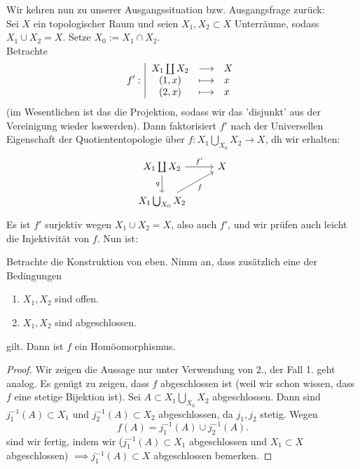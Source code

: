 Wir kehren nun zu unserer Ausgangssituation bzw. Ausgangsfrage zurück: \\
Sei $X$ ein topologischer Raum und seien  $X_1,X_2\subset X$ Unterräume, sodass $X_1 \cup X_2 = X$. Setze $X_0 := X_1 \cap  X_2$. \\
Betrachte
    \begin{equation*}
    f': \left| \begin{array}{c c l} 
    X_1\coprod X_2 & \longrightarrow & X \\
    (1,x) & \longmapsto &  x \\
    (2,x) & \longmapsto & x
    \end{array} \right.
\end{equation*}
(im Wesentlichen ist das die Projektion, sodass wir das 'disjunkt' aus der Vereinigung wieder loswerden). Dann faktorisiert $f'$ nach der Universellen Eigenschaft der Quotiententopologie über $f: X_1 \bigcup_{X_0} X_2 \to  X$, dh wir erhalten:
\[
\begin{tikzcd}
    X_1 \coprod X_2 \ar{r}{f'} \ar[swap]{d}{q} & X \\
    X_1 \bigcup_{X_0} X_2 \ar[swap]{ur}{f} 
\end{tikzcd}
\]
Es ist $f'$ surjektiv wegen  $X_1 \cup X_2 = X$, also auch $f'$, und wir prüfen auch leicht die Injektivität von  $f$. Nun ist:

\begin{theorem}\label{thm:raum-ist-koprodukt-über-schnitt-zweier-teilmengen-wenn-diese-offen-oder-abgeschlossen-sind}
    Betrachte die Konstruktion von eben. Nimm an, dass zusätzlich eine der Bedingungen
     \begin{enumerate}[1.]
        \item $X_1,X_2$ sind offen.
        \item $X_1,X_2$ sind abgeschlossen.
    \end{enumerate}
    gilt. Dann ist $f$ ein Homöomorphismus.
\end{theorem}

\begin{proof}
Wir zeigen die Aussage nur unter Verwendung von 2., der Fall 1. geht analog. Es genügt zu zeigen, dass $f$ abgeschlossen ist (weil wir schon wissen, dass  $f$ eine stetige Bijektion ist). Sei  $A\subset X_1\bigcup\limits_{X_0} X_2$ abgeschlossen. Dann sind $j^{-1}_1(A)\subset X_1$ und $j^{-1}_2(A)\subset X_2$ abgeschlossen, da $j_1,j_2$ stetig. Wegen
    \[
        f(A) = j^{-1}_1(A) \cup j^{-1}_2(A)
    .\] 
    sind wir fertig, indem wir ($j^{-1}_1(A)\subset X_1$ abgeschlossen und $X_1\subset X$ abgeschlossen) $\implies j^{-1}_1(A) \subset X$ abgeschlossen bemerken. 
\end{proof}

